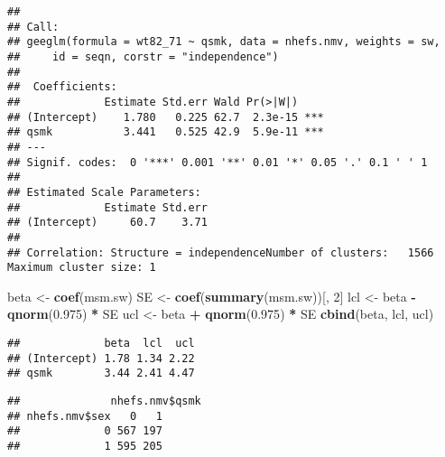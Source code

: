 \documentclass[
  10pt,
]{book}
\newenvironment{Shaded}{\begin{snugshade}}{\end{snugshade}}
\newcommand{\CommentTok}[1]{\textcolor[rgb]{0.56,0.35,0.01}{\textit{#1}}}
\newcommand{\DecValTok}[1]{\textcolor[rgb]{0.00,0.00,0.81}{#1}}
\newcommand{\FloatTok}[1]{\textcolor[rgb]{0.00,0.00,0.81}{#1}}
\newcommand{\KeywordTok}[1]{\textcolor[rgb]{0.13,0.29,0.53}{\textbf{#1}}}
\newcommand{\NormalTok}[1]{#1}
\newcommand{\OperatorTok}[1]{\textcolor[rgb]{0.81,0.36,0.00}{\textbf{#1}}}
\newcommand{\StringTok}[1]{\textcolor[rgb]{0.31,0.60,0.02}{#1}}
\begin{document}
\begin{verbatim}
## 
## Call:
## geeglm(formula = wt82_71 ~ qsmk, data = nhefs.nmv, weights = sw, 
##     id = seqn, corstr = "independence")
## 
##  Coefficients:
##             Estimate Std.err Wald Pr(>|W|)    
## (Intercept)    1.780   0.225 62.7  2.3e-15 ***
## qsmk           3.441   0.525 42.9  5.9e-11 ***
## ---
## Signif. codes:  0 '***' 0.001 '**' 0.01 '*' 0.05 '.' 0.1 ' ' 1
## 
## Estimated Scale Parameters:
##             Estimate Std.err
## (Intercept)     60.7    3.71
## 
## Correlation: Structure = independenceNumber of clusters:   1566   Maximum cluster size: 1
\end{verbatim}

\begin{Shaded}
\begin{Highlighting}[]
\NormalTok{beta <-}\StringTok{ }\KeywordTok{coef}\NormalTok{(msm.sw)}
\NormalTok{SE <-}\StringTok{ }\KeywordTok{coef}\NormalTok{(}\KeywordTok{summary}\NormalTok{(msm.sw))[, }\DecValTok{2}\NormalTok{]}
\NormalTok{lcl <-}\StringTok{ }\NormalTok{beta }\OperatorTok{-}\StringTok{ }\KeywordTok{qnorm}\NormalTok{(}\FloatTok{0.975}\NormalTok{) }\OperatorTok{*}\StringTok{ }\NormalTok{SE}
\NormalTok{ucl <-}\StringTok{ }\NormalTok{beta }\OperatorTok{+}\StringTok{ }\KeywordTok{qnorm}\NormalTok{(}\FloatTok{0.975}\NormalTok{) }\OperatorTok{*}\StringTok{ }\NormalTok{SE}
\KeywordTok{cbind}\NormalTok{(beta, lcl, ucl)}
\end{Highlighting}
\end{Shaded}

\begin{verbatim}
##             beta  lcl  ucl
## (Intercept) 1.78 1.34 2.22
## qsmk        3.44 2.41 4.47
\end{verbatim}

\begin{Shaded}
\end{Shaded}

\begin{verbatim}
##              nhefs.nmv$qsmk
## nhefs.nmv$sex   0   1
##             0 567 197
##             1 595 205
\end{verbatim}
\end{document}
